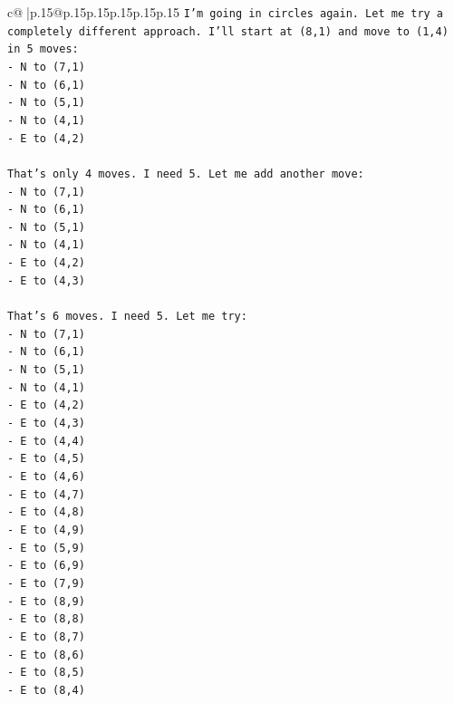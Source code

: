 \documentclass{article}
\begin{document}
{\begin{supertabular}{c@{$\;$}|p{.15\linewidth}@{}p{.15\linewidth}p{.15\linewidth}p{.15\linewidth}p{.15\linewidth}p{.15\linewidth}}
{{{\texttt{I'm going in circles again. Let me try a completely different approach. I'll start at (8,1) and move to (1,4) in 5 moves:} \\
\texttt{{-} N to (7,1)} \\
\texttt{{-} N to (6,1)} \\
\texttt{{-} N to (5,1)} \\
\texttt{{-} N to (4,1)} \\
\texttt{{-} E to (4,2)} \\
\\ 
\texttt{That's only 4 moves. I need 5. Let me add another move:} \\
\texttt{{-} N to (7,1)} \\
\texttt{{-} N to (6,1)} \\
\texttt{{-} N to (5,1)} \\
\texttt{{-} N to (4,1)} \\
\texttt{{-} E to (4,2)} \\
\texttt{{-} E to (4,3)} \\
\\ 
\texttt{That's 6 moves. I need 5. Let me try:} \\
\texttt{{-} N to (7,1)} \\
\texttt{{-} N to (6,1)} \\
\texttt{{-} N to (5,1)} \\
\texttt{{-} N to (4,1)} \\
\texttt{{-} E to (4,2)} \\
\texttt{{-} E to (4,3)} \\
\texttt{{-} E to (4,4)} \\
\texttt{{-} E to (4,5)} \\
\texttt{{-} E to (4,6)} \\
\texttt{{-} E to (4,7)} \\
\texttt{{-} E to (4,8)} \\
\texttt{{-} E to (4,9)} \\
\texttt{{-} E to (5,9)} \\
\texttt{{-} E to (6,9)} \\
\texttt{{-} E to (7,9)} \\
\texttt{{-} E to (8,9)} \\
\texttt{{-} E to (8,8)} \\
\texttt{{-} E to (8,7)} \\
\texttt{{-} E to (8,6)} \\
\texttt{{-} E to (8,5)} \\
\texttt{{-} E to (8,4)} \\
}}}
\end{supertabular}}
\end{document}
